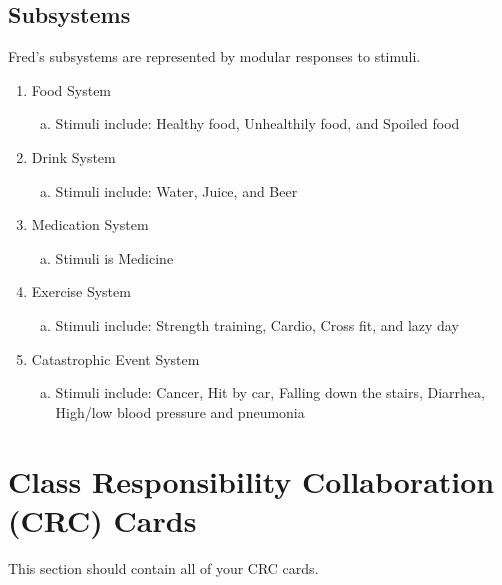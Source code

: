 \documentclass[]{article}
\begin{document}

\subsection{Subsystems}
\label{sub:subsystems}

Fred's subsystems are represented by modular responses to stimuli.

\begin{enumerate}[1)]
	\item Food System
		\begin{enumerate}[a)]
			\item Stimuli include: Healthy food, Unhealthily food, and Spoiled food
		\end{enumerate}
	\item Drink System
		\begin{enumerate}[a)]
			\item Stimuli include: Water, Juice, and Beer
		\end{enumerate}
	\item Medication System
		\begin{enumerate}[a)]
			\item Stimuli is Medicine
		\end{enumerate}
	\item Exercise System
		\begin{enumerate}[a)]
			\item Stimuli include: Strength training, Cardio, Cross fit, and lazy day
		\end{enumerate}
	\item Catastrophic Event System
		\begin{enumerate}[a)]
			\item Stimuli include: Cancer, Hit by car, Falling down the stairs, Diarrhea, High/low blood pressure and pneumonia
		\end{enumerate}
\end{enumerate}

	
\section{Class Responsibility Collaboration (CRC) Cards}
\label{sec:class_responsibility_collaboration_crc_cards}
This section should contain all of your CRC cards.
\end{document}
